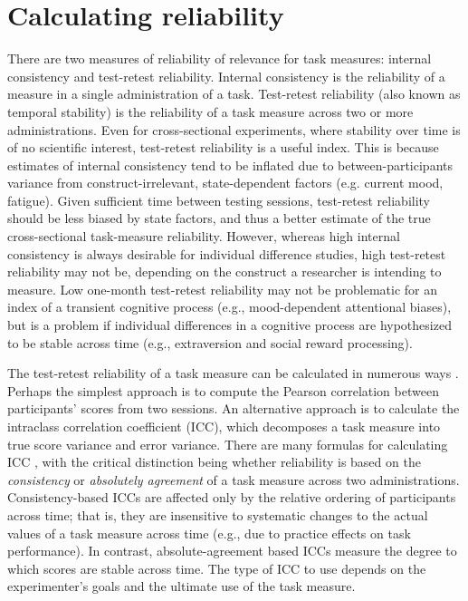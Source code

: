 \documentclass[a4paper,12pt]{article}
\begin{document}
\section{Calculating reliability}

There are two measures of reliability of relevance for task measures: internal consistency and test-retest reliability. Internal consistency is the reliability of a measure in a single administration of a task. Test-retest reliability (also known as temporal stability) is the reliability of a task measure across two or more administrations. Even for cross-sectional experiments, where stability over time is of no scientific interest, test-retest reliability is a useful index. This is because estimates of internal consistency tend to be inflated due to between-participants variance from construct-irrelevant, state-dependent factors (e.g. current mood, fatigue). Given sufficient time between testing sessions, test-retest reliability should be less biased by state factors, and thus a better estimate of the true cross-sectional task-measure reliability. However, whereas high internal consistency is always desirable for individual difference studies, high test-retest reliability may not be, depending on the construct a researcher is intending to measure. Low one-month test-retest reliability may not be problematic for an index of a transient cognitive process (e.g., mood-dependent attentional biases), but is a problem if individual differences in a cognitive process are hypothesized to be stable across time (e.g., extraversion and social reward processing).

The test-retest reliability of a task measure can be calculated in numerous ways \cite{Parsons2019-jw}. Perhaps the simplest approach is to compute the Pearson correlation between participants' scores from two sessions. An alternative approach is to calculate the intraclass correlation coefficient (ICC), which decomposes a task measure into true score variance and error variance. There are many formulas for calculating ICC \cite{Koo2016-fz}, with the critical distinction being whether reliability is based on the \textit{consistency} or \textit{absolutely agreement} of a task measure across two administrations. Consistency-based ICCs are affected only by the relative ordering of participants across time; that is, they are insensitive to systematic changes to the actual values of a task measure across time (e.g., due to practice effects on task performance). In contrast, absolute-agreement based ICCs measure the degree to which scores are stable across time. The type of ICC to use depends on the experimenter's goals and the ultimate use of the task measure. %
\end{document}
